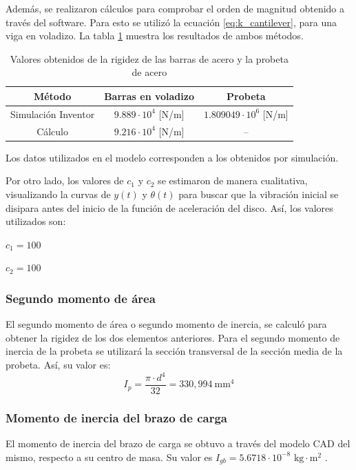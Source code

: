 Además, se realizaron cálculos para comprobar el orden de magnitud obtenido a través del software. Para esto se utilizó la ecuación \ref{eq:k_cantilever}, para una viga en voladizo. La tabla \ref{tab:k_valor} muestra los resultados de ambos métodos.
\begin{table}[h]
\centering
\begin{tabular}{ccc}
\hline
Método & Barras en voladizo & Probeta \\ \hline
Simulación Inventor & $9.889\cdot 10^4$ [N/m] & $1.809049\cdot 10^6$ [N/m] \\
Cálculo & $9.216\cdot 10^4$ [N/m] & -- \\ \hline
\end{tabular}
\caption{Valores obtenidos de la rigidez de las barras de acero y la probeta de acero}
\label{tab:k_valor}
\end{table}
Los datos utilizados en el modelo corresponden a los obtenidos por simulación.

Por otro lado, los valores de $c_1$ y $c_2$ se estimaron de manera cualitativa, visualizando la curvas de $y(t)$ y $\theta(t)$ para buscar que la vibración inicial se disipara antes del inicio de la función de aceleración del disco. Así, los valores utilizados son:
\begin{itemize*}
	\item $c_1= 100$
	\item $c_2= 100$ 
\end{itemize*}
\subsubsection{Segundo momento de área}
El segundo momento de área o segundo momento de inercia, se calculó para obtener la rigidez de los dos elementos anteriores. Para el segundo momento de inercia de la probeta se utilizará la sección transversal de la sección media de la probeta. Así, su valor es:
\begin{equation}
	I_p = \frac{\pi \cdot d^4}{32} = 330,994\: \text{mm}^4
\end{equation}

\subsubsection{Momento de inercia del brazo de carga}
El momento de inercia del brazo de carga se obtuvo a través del modelo CAD del mismo, respecto a su centro de masa. Su valor es $I_{gb} = 5.6718\cdot 10^{-8} \text{ kg}\cdot \text{m}^2$ . 

